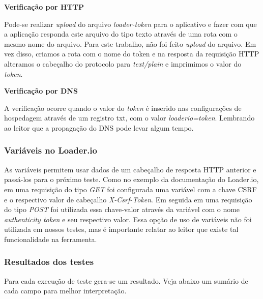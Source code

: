   \textbf{Verificação por HTTP}

  Pode-se realizar \textit{upload} do arquivo \textit{loader-token} para o aplicativo e fazer com que a aplicação
  responda este arquivo do tipo texto através de uma rota com o mesmo nome do arquivo.
  Para este trabalho, não foi feito \textit{upload} do arquivo. Em vez disso, criamos a rota com o nome do token e
  na resposta da requisição \ac{HTTP} alteramos o cabeçalho do protocolo para \textit{text/plain} e imprimimos
  o valor do \textit{token}.

  \textbf{Verificação por DNS}

  A verificação ocorre quando o valor do \textit{token} é inserido nas configurações de hospedagem através de um
  registro txt, com o valor \textit{loaderio=token}.
  Lembrando ao leitor que a propagação do \ac{DNS} pode levar algum tempo.

\subsubsection{Variáveis no Loader.io}

  As variáveis permitem usar dados de um cabeçalho de resposta \ac{HTTP} anterior e passá-los para o próximo
  teste.
  Como no exemplo da documentação do Loader.io, em uma requisição do tipo \textit{GET} foi configurada uma variável
  com a chave CSRF e o respectivo valor de cabeçalho \textit{X-Csrf-Token}. Em seguida em uma requisição
  do tipo \textit{POST} foi utilizada essa chave-valor através da variável com o nome \textit{authenticity token} e seu respectivo
  valor.
  Essa opção de uso de variáveis não foi utilizada em nossos testes, mas é importante relatar ao leitor que
  existe tal funcionalidade na ferramenta.


\subsubsection{Resultados dos testes}
  
  \vspace{-0.7cm}
  
  Para cada execução de teste gera-se um resultado. Veja abaixo um sumário de cada campo para melhor interpretação.


